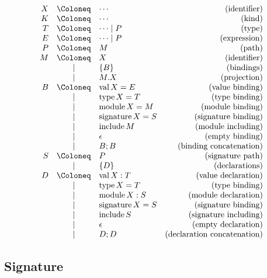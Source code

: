 \begin{align*}
  \begin{array}{rclr}
  X
  & \Coloneq & \cdots &(\text{identifier}) \\
  K
  & \Coloneq & \cdots &(\text{kind}) \\
  T
  & \Coloneq & \cdots \mid P &(\text{type}) \\
  E
  & \Coloneq & \cdots \mid P &(\text{expression}) \\
  P
  & \Coloneq & M &(\text{path}) \\
  M
  & \Coloneq & X &(\text{identifier}) \\
  & \mid & \{ B \} &(\text{bindings}) \\
  & \mid & M.X &(\text{projection}) \\
  B
  & \Coloneq & \symval X = E &(\text{value binding}) \\
  & \mid & \symtype X = T &(\text{type binding}) \\
  & \mid & \symmodule X = M &(\text{module binding}) \\
  & \mid & \symsignature X = S &(\text{signature binding}) \\
  & \mid & \syminclude M &(\text{module including}) \\
  & \mid & \epsilon &(\text{empty binding}) \\
  & \mid & B; B &(\text{binding concatenation}) \\
  S
  & \Coloneq & P &(\text{signature path}) \\
  & \mid & \{ D \} &(\text{declarations}) \\
  D
  & \Coloneq & \symval X: T &(\text{value declaration}) \\
  & \mid & \symtype X = T &(\text{type binding}) \\
  & \mid & \symmodule X: S &(\text{module declaration}) \\
  & \mid & \symsignature X = S &(\text{signature binding}) \\
  & \mid & \syminclude S &(\text{signature including}) \\
  & \mid & \epsilon &(\text{empty declaration}) \\
  & \mid & D; D &(\text{declaration concatenation})
  \end{array}
\end{align*}

\subsection{Signature}

